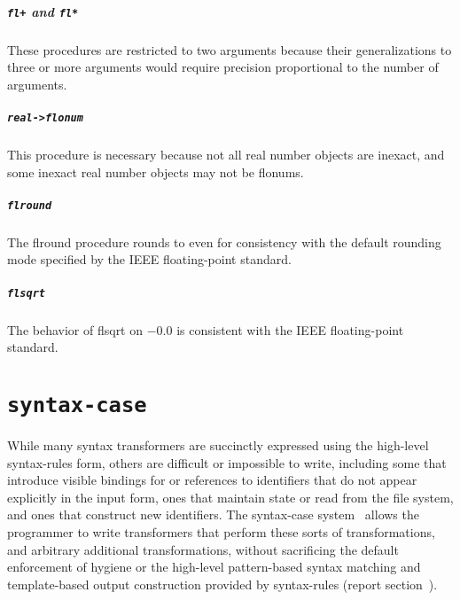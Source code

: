 \documentclass[twoside,twocolumn]{algol60}
\begin{document}
\paragraph{{\tt fl+} and {\tt fl*}}

These procedures are restricted to two arguments because their
generalizations to three or more arguments would require
precision proportional to the number of arguments.

\paragraph{{\tt real->flonum}}

This procedure is necessary because not all real number objects are inexact, and
some inexact real number objects may not be flonums.

\paragraph{{\tt flround}}

The {\cf flround} procedure rounds to even for consistency with the default rounding
mode specified by the IEEE floating-point standard.

\paragraph{{\tt flsqrt}}

The behavior of {\cf flsqrt} on $-0.0$ is consistent with the IEEE
floating-point standard.


\chapter{{\tt syntax-case}}

While many syntax transformers are succinctly expressed using the
high-level {\cf syntax-rules} form, others are difficult or impossible
to write, including some that introduce visible bindings for or references
to identifiers that do not appear explicitly in the input form, ones that
maintain state or read from the file system, and ones that construct new
identifiers.
The {\cf syntax-case} system~\cite{syntacticabstraction} 
allows the programmer to write transformers that perform these sorts of
transformations, and arbitrary additional transformations, without
sacrificing the default enforcement of hygiene or the high-level
pattern-based syntax matching and template-based output construction
provided by {\cf syntax-rules} (report
section~).
\end{document}
